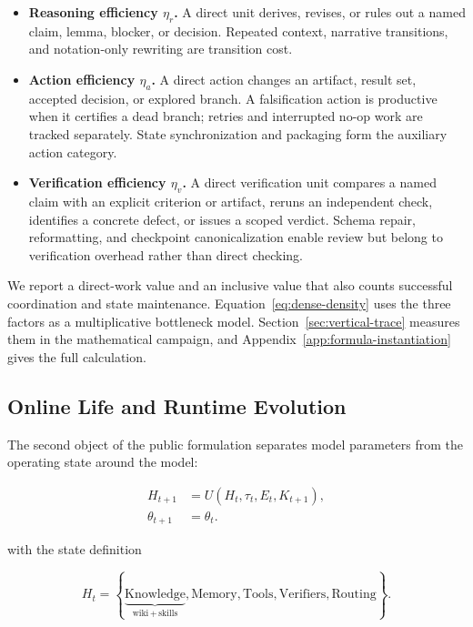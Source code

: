 \begin{itemize}
  \item \textbf{Reasoning efficiency $\eta_r$.} A direct unit derives, revises, or
    rules out a named claim, lemma, blocker, or decision. Repeated context,
    narrative transitions, and notation-only rewriting are transition cost.
  \item \textbf{Action efficiency $\eta_a$.} A direct action changes an artifact,
    result set, accepted decision, or explored branch. A falsification action is
    productive when it certifies a dead branch; retries and interrupted no-op work
    are tracked separately. State synchronization and packaging form the auxiliary
    action category.
  \item \textbf{Verification efficiency $\eta_v$.} A direct verification unit
    compares a named claim with an explicit criterion or artifact, reruns an
    independent check, identifies a concrete defect, or issues a scoped verdict.
    Schema repair, reformatting, and checkpoint canonicalization enable review but
    belong to verification overhead rather than direct checking.
\end{itemize}

We report a direct-work value and an inclusive value that also counts successful
coordination and state maintenance. Equation~\ref{eq:dense-density} uses the three
factors as a multiplicative bottleneck model. Section~\ref{sec:vertical-trace}
measures them in the mathematical campaign, and
Appendix~\ref{app:formula-instantiation} gives the full calculation.

\subsection{Online Life and Runtime Evolution}

The second object of the public formulation separates model parameters from the
operating state around the model:

\begin{equation}
  \begin{aligned}
    H_{t+1} &= U(H_t,\tau_t,E_t,K_{t+1}), \\
    \theta_{t+1} &= \theta_t.
  \end{aligned}
  \label{eq:runtime-update}
\end{equation}

with the state definition

\begin{equation}
  H_t=\left\{\underbrace{\text{Knowledge}}_{\text{wiki}\,+\,\text{skills}},
  \text{Memory},\text{Tools},\text{Verifiers},\text{Routing}\right\}.
  \label{eq:website-state}
\end{equation}

